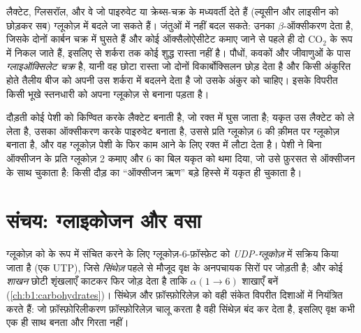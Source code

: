 \begin{proposition}[क्या ग्लूकोज़ बन सकता है और क्या नहीं]\label{prop:b1:biosyntheses-integration:cannot}
लैक्टेट, ग्लिसरॉल, और वे  जो पाइरुवेट या क्रेब्स-चक्र के
मध्यवर्ती देते हैं (ल्यूसीन और लाइसीन को छोड़कर सब) ग्लूकोज़ में बदले जा
सकते हैं। जंतुओं में  नहीं बदल सकते: उनका $\beta$-ऑक्सीकरण
 देता है, जिसके दोनों कार्बन चक्र में घुसते हैं और कोई
ऑक्सैलोऐसीटेट कमाए जाने से पहले ही दो $\mathrm{CO_2}$ के रूप में निकल
जाते हैं, इसलिए  से शर्करा तक कोई शुद्ध रास्ता नहीं है। पौधों,
कवकों और जीवाणुओं के पास \emph{ग्लाइऑक्सिलेट चक्र} है, यानी वह छोटा
रास्ता जो दोनों विकार्बोक्सिलन छोड़ देता है और किसी अंकुरित होते तैलीय
बीज को अपनी  उस शर्करा में बदलने देता है जो उसके अंकुर को चाहिए।
इसके विपरीत किसी भूखे स्तनधारी को अपना ग्लूकोज़  से बनाना पड़ता है।
\end{proposition}

\begin{example}[कोरी चक्र]\label{ex:b1:biosyntheses-integration:cori}
दौड़ती कोई पेशी  को किण्वित करके लैक्टेट बनाती है, जो रक्त में
घुस जाता है; यकृत उस लैक्टेट को ले लेता है, उसका ऑक्सीकरण करके पाइरुवेट
बनाता है, उससे प्रति ग्लूकोज़ 6  की क़ीमत पर ग्लूकोज़ बनाता है, और वह
ग्लूकोज़ पेशी के फिर काम आने के लिए रक्त में लौटा देता है। पेशी ने बिना
ऑक्सीजन के प्रति ग्लूकोज़ 2  कमाए और 6 का बिल यकृत को थमा दिया, जो उसे
फ़ुरसत से ऑक्सीजन के साथ चुकाता है: किसी दौड़ का ``ऑक्सीजन ऋण'' बड़े
हिस्से में यकृत ही चुकाता है।
\end{example}

\section{संचय: ग्लाइकोजन और वसा}

\begin{definition}[ग्लाइकोजन संश्लेषण]\label{def:b1:biosyntheses-integration:glycogensynthesis}
ग्लूकोज़ को  के रूप में संचित करने के लिए
ग्लूकोज़-6-फ़ॉस्फ़ेट को \emph{UDP-ग्लूकोज़} में सक्रिय किया जाता है (एक
UTP), जिसे \emph{ सिंथेज़} पहले से मौजूद वृक्ष के अनपचायक सिरों
पर जोड़ती है; और कोई \emph{शाखन } छोटी शृंखलाएँ काटकर फिर जोड़
देता है ताकि $\alpha(1{\to}6)$ शाखाएँ बनें
(\cref{ch:b1:carbohydrates})। सिंथेज़ और फ़ॉस्फ़ोरिलेज़ को वही संकेत
विपरीत दिशाओं में नियंत्रित करते हैं: जो फ़ॉस्फ़ोरिलीकरण
फ़ॉस्फ़ोरिलेज़ चालू करता है वही सिंथेज़ बंद कर देता है, इसलिए वृक्ष कभी
एक ही साथ बनता और गिरता नहीं।
\end{definition}

